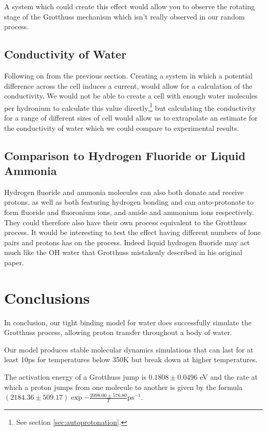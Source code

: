 \documentclass{article}
\begin{document}
\begin{multicols}{2}
A system which could create this effect would allow you to observe the rotating stage of the Grotthuss mechanism which isn't really observed in our random process.

\subsection{Conductivity of Water}
Following on from the previous section. Creating a system in which a potential difference across the cell induces a current, would allow for a calculation of the conductivity. We would not be able to create a cell with enough water molecules per hydronium to calculate this value directly,\footnote{See section \ref{sec:autoprotonation}.} but calculating the conductivity for a range of different sizes of cell would allow us to extrapolate an estimate for the conductivity of water which we could compare to experimental results.\cite{Rodger1894}

\subsection{Comparison to Hydrogen Fluoride or Liquid Ammonia}
Hydrogen fluoride and ammonia molecules can also both donate and receive protons, as well as both featuring hydrogen bonding and can auto-protonate to form fluoride and fluoronium ions, and amide and ammonium ions respectively. They could therefore also have their own process equivalent to the Grotthuss process. It would be interesting to test the effect  having different numbers of lone pairs and protons has on the process. Indeed liquid hydrogen fluoride may act much like the OH water that Grotthuss mistakenly described in his original paper.\cite{Grotthuss1805}

\section{Conclusions}
In conclusion, our tight binding model for water does successfully simulate the Grotthuss process, allowing proton transfer throughout a body of water. 

Our model produces stable molecular dynamics simulations that can last for at least 10ps for temperatures below 350K but break down at higher temperatures.

The activation energy of a Grotthuss jump is $0.1808 \pm 0.0496$ eV and the rate at which a proton jumps from one molecule to another is given by the formula $(2184.36 \pm 509.17)\exp{-\frac{2098.00 \pm 576.80}{T}} \text{ps}^{-1}$.


 
	
\end{multicols}
\end{document}
